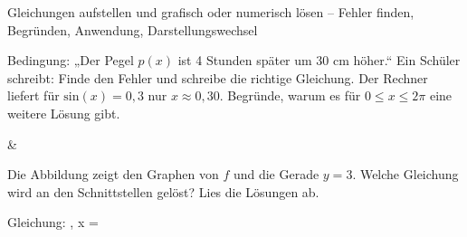 \begin{aufgabe}{Gleichungen aufstellen und grafisch oder numerisch lösen – Fehler finden, Begründen, Anwendung, Darstellungswechsel}
\begin{teile}
\teil Bedingung: „Der Pegel $p(x)$ ist 4 Stunden später um 30 cm höher.“ Ein Schüler schreibt:  Finde den Fehler und schreibe die richtige Gleichung.
\teil Der Rechner liefert für $\mathrm{sin}(x) = 0{,}3$ nur $x \approx 0{,}30$. Begründe, warum es für $0 \le x \le 2\pi$ eine weitere Lösung gibt.
\end{teile}
\begin{gleichungsraster}[2]
 &
\end{gleichungsraster}
\begin{teile}
\teil Die Abbildung zeigt den Graphen von $f$ und die Gerade $y = 3$. Welche Gleichung wird an den Schnittstellen gelöst? Lies die Lösungen ab.

\begin{ksys}[xmin=-3,xmax=5,ymin=0,ymax=6,ablesen]   \end{ksys}
Gleichung: \leerfeld , x = \leerfeld
\end{teile}
\end{aufgabe}

